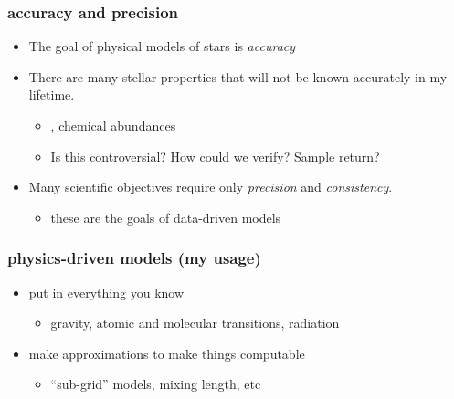 \documentclass[pdftex]{beamer}
\begin{document}
\begin{frame}
  \frametitle{accuracy and precision}
  \begin{itemize}
  \item The goal of physical models of stars is \emph{accuracy}
  \item There are many stellar properties that will not be known accurately in my lifetime.
    \begin{itemize}
    \item \eg, chemical abundances
    \item Is this controversial? How could we verify? Sample return?
    \end{itemize}
  \item Many scientific objectives require only \emph{precision} and \emph{consistency}.
    \begin{itemize}
    \item these are the goals of data-driven models
    \end{itemize}
  \end{itemize}
\end{frame}

\begin{frame}
  \frametitle{physics-driven models (my usage)}
  \begin{itemize}
  \item put in everything you know
    \begin{itemize}
    \item gravity, atomic and molecular transitions, radiation
    \end{itemize}
  \item make approximations to make things computable
    \begin{itemize}
    \item ``sub-grid'' models, mixing length, etc
    \end{itemize}
  \end{itemize}
\end{frame}
\end{document}
